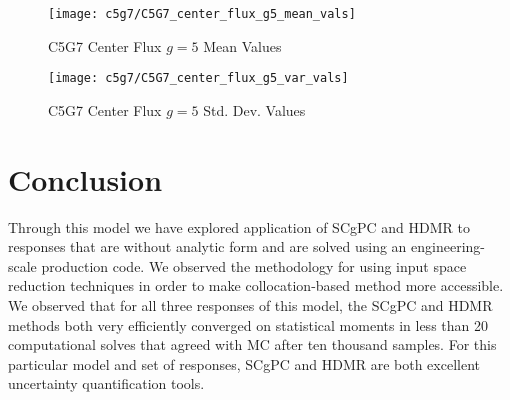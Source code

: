 \begin{figure}[H]
  \centering
  \texttt{[image: c5g7/C5G7\_center\_flux\_g5\_mean\_vals]}
  \caption{C5G7 Center Flux $g=5$ Mean Values}
  \label{fig:c5g7 center_flux_g5 means}
\end{figure}
\begin{figure}[H]
  \centering
  \texttt{[image: c5g7/C5G7\_center\_flux\_g5\_var\_vals]}
  \caption{C5G7 Center Flux $g=5$ Std. Dev. Values}
  \label{fig:c5g7 center_flux_g5 vars}
\end{figure}

\section{Conclusion}
Through this model we have explored application of SCgPC and HDMR to responses that are without analytic form
and are solved using an engineering-scale production code.  We observed the methodology for using input space
reduction techniques in order to make collocation-based method more accessible.  We observed that for all
three responses of this model, the SCgPC and HDMR methods both very efficiently converged on statistical
moments in less than 20 computational solves that agreed with MC after ten thousand samples.  For this
particular model and set of responses, SCgPC and HDMR are both excellent uncertainty quantification tools.
